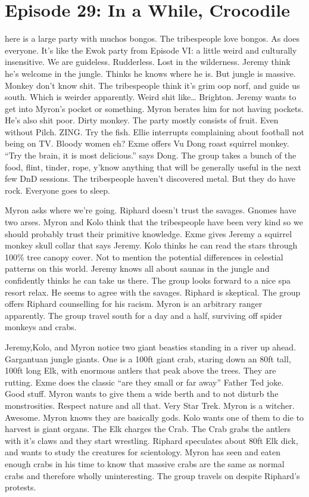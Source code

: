 \section{Episode 29: In a While, Crocodile}

\begin{multicols}{2}

here is a large party with muchos bongos. The tribespeople love bongos. As does everyone. It’s like the Ewok party from Episode VI: a little weird and culturally insensitive. We are guideless. Rudderless. Lost in the wilderness. 
Jeremy think he’s welcome in the jungle. Thinks he knows where he is. But jungle is massive. Monkey don’t know shit. 
The tribespeople think it’s grim oop norf, and guide us south. Which is weirder apparently. Weird shit like… Brighton. Jeremy wants to get into Myron’s pocket or something. Myron berates him for not having pockets. He’s also shit poor. Dirty monkey. The party mostly consists of fruit. Even without Pilch. ZING. Try the fish. Ellie interrupts complaining about football not being on TV. Bloody women eh? Exme offers Vu Dong roast squirrel monkey. “Try the brain, it is most delicious.” says Dong. The group takes a bunch of the food, flint, tinder, rope, y’know anything that will be generally useful in the next few DnD sessions. The tribespeople haven’t discovered metal. But they do have rock. Everyone goes to sleep.\medskip

Myron asks where we’re going. Riphard doesn’t trust the savages. Gnomes have two arses. Myron and Kolo think that the tribespeople have been very kind so we should probably trust their primitive knowledge. Exme gives Jeremy a squirrel monkey skull collar that says Jeremy. Kolo thinks he can read the stars through 100\% tree canopy cover. Not to mention the potential differences in celestial patterns on this world. Jeremy knows all about saunas in the jungle and confidently thinks he can take us there. The group looks forward to a nice spa resort relax. He seems to agree with the savages. Riphard is skeptical. The group offers Riphard counselling for his racism. Myron is an arbitrary ranger apparently. The group travel south for a day and a half, surviving off spider monkeys and crabs.\medskip

Jeremy,Kolo, and Myron notice two giant beasties standing in a river up ahead. Gargantuan jungle giants. One is a 100ft giant crab, staring down an 80ft tall, 100ft long Elk, with enormous antlers that peak above the trees. They are rutting. Exme does the classic “are they small or far away” Father Ted joke. Good stuff. Myron wants to give them a wide berth and to not disturb the monstrosities. Respect nature and all that. Very Star Trek. Myron is a witcher. Awesome. Myron knows they are basically gods. Kolo wants one of them to die to harvest is giant organs. The Elk charges the Crab. The Crab grabs the antlers with it’s claws and they start wrestling. Riphard speculates about 80ft Elk dick, and wants to study the creatures for scientology. Myron has seen and eaten enough crabs in his time to know that massive crabs are the same as normal crabs and therefore wholly uninteresting. The group travels on despite Riphard’s protests.\medskip


\end{multicols}
